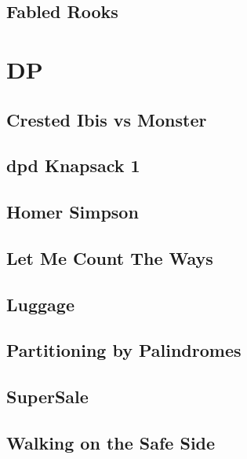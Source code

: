         \subsection{Fabled Rooks}        
                

\section{DP}
        \subsection{Crested Ibis vs Monster}
                
        \subsection{dpd Knapsack 1}
                
        \subsection{Homer Simpson}
                
        \subsection{Let Me Count The Ways}
                
        \subsection{Luggage}
                
        \subsection{Partitioning by Palindromes}
                
        \subsection{SuperSale}
                
        \subsection{Walking on the Safe Side}
                
